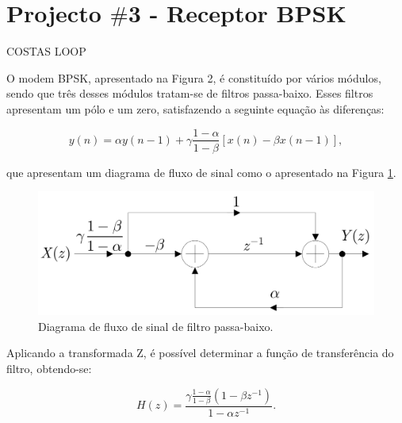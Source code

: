 \documentclass[11pt]{article}
\numberwithin{equation}{section}
\begin{document}
 


\section{Projecto $\#$3 - Receptor BPSK}


COSTAS LOOP



O modem BPSK, apresentado na Figura 2, é constituído por vários módulos, sendo que três desses módulos tratam-se de filtros passa-baixo. Esses filtros apresentam um pólo e um zero, satisfazendo a seguinte equação às diferenças:

\vspace{-3mm}
\begin{equation}
y(n) = \alpha y(n-1) + \gamma \frac{1-\alpha}{1-\beta}[x(n)-\beta x(n-1)],
\end{equation} 

\vspace{1mm}
que apresentam um diagrama de fluxo de sinal como o apresentado na Figura \ref{fig:fluxo}.

\begin{figure}[H]
	\centering
	\includegraphics[keepaspectratio=true, scale=0.20]{teoricas/diagrama_fluxo}
	\caption{Diagrama de fluxo de sinal de filtro passa-baixo.}
	\label{fig:fluxo}
	\vspace{-0.8em}
\end{figure}

Aplicando a transformada Z, é possível determinar a função de transferência do filtro, obtendo-se:

\vspace{-3mm}
\begin{equation}
H(z) = \frac{\gamma \frac{1-\alpha}{1-\beta} (1-\beta z^{-1})}{1-\alpha z^{-1}}.
\end{equation}
 
\end{document}
